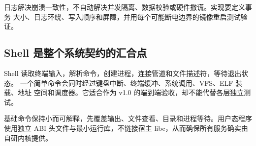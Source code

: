 日志解决崩溃一致性，不自动解决并发隔离、数据校验或硬件撒谎。实现要定义事务
大小、日志环绕、写入顺序和屏障，并用每个可能断电边界的镜像重启测试验证。

\subsection{Shell 是整个系统契约的汇合点}

Shell 读取终端输入，解析命令，创建进程，连接管道和文件描述符，等待退出状态。
一个简单命令会同时经过键盘中断、终端缓冲、系统调用、VFS、ELF 装载、地址
空间和调度器。它适合作为 v1.0 的端到端验收，却不能代替各层独立测试。

基础命令保持小而可解释，先覆盖输出、文件查看、目录和进程等待。用户态程序
使用独立 ABI 头文件与最小运行库，不链接宿主 libc，从而确保所有服务确实由
自研内核提供。
